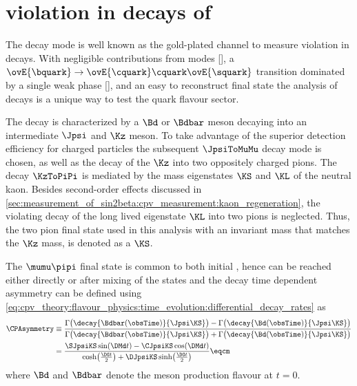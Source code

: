 
\section[
  head={\CP violation in decays of \BdToJpsiKS},
  tocentry={\CPHyperref violation in decays of \BdToJpsiKSHyperref}
]{\CPbfsf violation in decays of \BdToJpsiKSbfsf}
\label{sec:cpv_theory:bd2jpsiks}


The decay mode \BdToJpsiKS is well known  as the gold-plated channel to measure
\CP violation in \Bd decays. With negligible contributions from \DCS
modes [], a $\ovE{\bquark}\to\ovE{\cquark}\cquark\ovE{\squark}$ transition
dominated by a single weak phase [], and an easy to reconstruct final state the
analysis of \BdToJpsiKS decays is a unique way to test the \SM quark flavour
sector.


The decay is characterized by a $\Bd$ or $\Bdbar$ meson decaying into an
intermediate $\Jpsi$ and $\Kz$ meson. To take advantage of the superior
detection efficiency for charged particles the subsequent $\JpsiToMuMu$ decay
mode is chosen, as well as the decay of the $\Kz$ into two oppositely charged
pions. The decay $\KzToPiPi$ is mediated by the mass eigenstates $\KS$ and $\KL$
of the neutral kaon. Besides second-order effects discussed in
\cref{sec:measurement_of_sin2beta:cpv_measurement:kaon_regeneration}, the \CP
violating decay of the long lived eigenstate $\KL$ into two pions is neglected.
Thus, the two pion final state used in this analysis with an invariant mass that
matches the $\Kz$ mass, is denoted as a $\KS$. 

The $\mumu\pipi$ final state is common to both initial \Bmesons, hence can be
reached either directly or after mixing of the \Bmeson states and the decay time
dependent \CP asymmetry \CPAsymmetry can be defined using
\cref{eq:cpv_theory:flavour_physics:time_evolution:differential_decay_rates} as
%
\begin{equation}\label{eq:cpv_theory:bd2jpsiks:cp_asymmetry}
  \begin{split}
    \CPAsymmetry &\equiv 
      \frac{\Gamma\bigl(\decay{\Bdbar(\obsTime)}{\Jpsi\KS}\bigr) - \Gamma\bigl(\decay{\Bd(\obsTime)}{\Jpsi\KS}\bigr)}
           {\Gamma\bigl(\decay{\Bdbar(\obsTime)}{\Jpsi\KS}\bigr) + \Gamma\bigl(\decay{\Bd(\obsTime)}{\Jpsi\KS}\bigr)} \\
                 &= \frac{\SJpsiKS\sin(\DMd t) - \CJpsiKS\cos(\DMd t)}{\cosh\bigl(\frac{\DG t}{2}\bigr) + \DJpsiKS\sinh\bigl(\frac{\DG t}{2}\bigr)} \eqcm
  \end{split}
\end{equation}
%
where $\Bd$ and $\Bdbar$ denote the meson production flavour at $t=0$.

